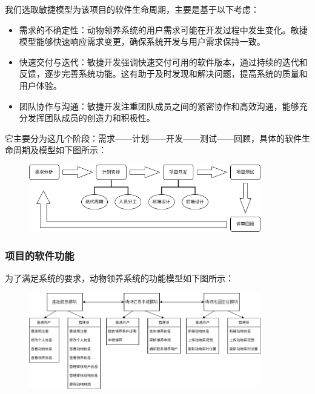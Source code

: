 \documentclass[12pt,a4paper,UTF8]{article}
\begin{document}
我们选取敏捷模型为该项目的软件生命周期，主要是基于以下考虑：
\begin{itemize}
  \item 需求的不确定性：动物领养系统的用户需求可能在开发过程中发生变化。敏捷模型能够快速响应需求变更，确保系统开发与用户需求保持一致。
  \item 快速交付与迭代：敏捷开发强调快速交付可用的软件版本，通过持续的迭代和反馈，逐步完善系统功能。这有助于及时发现和解决问题，提高系统的质量和用户体验。
  \item 团队协作与沟通：敏捷开发注重团队成员之间的紧密协作和高效沟通，能够充分发挥团队成员的创造力和积极性。
\end{itemize}

它主要分为这几个阶段：需求——计划——开发——测试——回顾，具体的软件生命周期及模型如下图所示：

\begin{figure}[!htbp]
  \centering
  \includegraphics[width=0.9\textwidth]{figures/process_model.png}
\end{figure}

\subsubsection{项目的软件功能}

为了满足系统的要求，动物领养系统的功能模型如下图所示：
\begin{figure}[!htbp]
  \centering
  \includegraphics[width=0.9\textwidth]{figures/function_model.png}
\end{figure}
\end{document}
